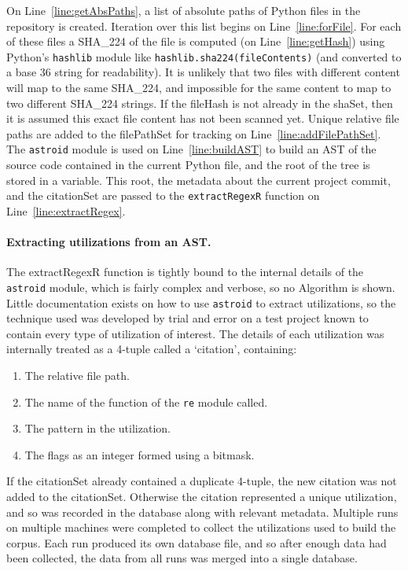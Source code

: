 On Line~\ref{line:getAbsPaths}, a list of absolute paths of Python files in the repository is created.  Iteration over this list begins on Line~\ref{line:forFile}.  For each of these files a SHA\_224 of the file is computed (on Line~\ref{line:getHash}) using Python's {\tt hashlib} module like {\tt hashlib.sha224(fileContents)} (and converted to a base 36 string for readability).  It is unlikely that two files with different content will map to the same SHA\_224, and impossible for the same content to map to two different SHA\_224 strings.  If the fileHash is not already in the shaSet, then it is assumed this exact file content has not been scanned yet.  Unique relative file paths are added to the filePathSet for tracking on Line~\ref{line:addFilePathSet}.  The {\tt astroid} module is used on Line~\ref{line:buildAST} to build an AST of the source code contained in the current Python file, and the root of the tree is stored in a variable.  This root, the metadata about the current project commit, and the citationSet are passed to the {\tt extractRegexR} function on Line~\ref{line:extractRegex}.

\paragraph{Extracting utilizations from an AST.}  The extractRegexR function is tightly bound to the internal details of the {\tt astroid} module, which is fairly complex and verbose, so no Algorithm is shown.  Little documentation exists on how to use {\tt astroid} to extract utilizations, so the technique used was developed by trial and error on a test project known to contain every type of utilization of interest.  The details of each utilization was internally treated as a 4-tuple called a `citation', containing:
\begin{enumerate} \itemsep -1pt
\item The relative file path.
\item The name of the function of the {\tt re} module called.
\item The pattern in the utilization.
\item The flags as an integer formed using a bitmask.
\end{enumerate}
If the citationSet already contained a duplicate 4-tuple, the new citation was not added to the citationSet.  Otherwise the citation represented a unique utilization, and so was recorded in the database along with relevant metadata.  Multiple runs on multiple machines were completed to collect the utilizations used to build the corpus.  Each run produced its own database file, and so after enough data had been collected, the data from all runs was merged into a single database.

